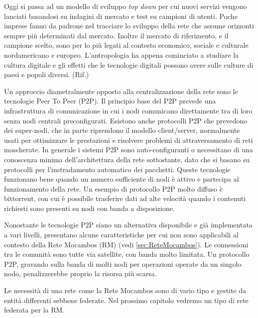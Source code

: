 Oggi si passa ad un modello di sviluppo \emph{top down} per cui nuovi
servizi vengono lanciati basandosi su indagini di mercato e test su
campioni di utenti. Poche imprese fanno da padrone nel tracciare lo
sviluppo della rete che assume orizzonti sempre più determinati dal
mercato. Inoltre il mercato di riferimento, e il campione scelto, sono
per lo più legati al contesto economico, sociale e culturale
nordamericano e europeo. L'antropologia ha appena cominciato a
studiare la cultura digitale e gli effetti che le tecnologie digitali
possono avere sulle culture di paesi e popoli diversi. (Rif.)

Un approccio diametralmente opposto alla centralizzazione della rete
sono le tecnologie Peer To Peer (P2P). Il principio base del P2P
prevede una infrastruttura di comunicazione in cui i nodi comunicano
direttamente tra di loro senza nodi centrali preconfigurati. Esistono
anche protocolli P2P che prevedono dei super-nodi, che in parte
riprendono il modello client/server, normalmente usati per ottimizzare
le prestazioni e risolvere problemi di attraversamento di reti
mascherate. In generale i sistemi P2P sono auto-configuranti o
necessitano di una conoscenza minima dell'architettura della rete
sottostante, dato che si basano su protocolli per l'instradamento
automatico dei pacchetti. Queste tecnologie funzionano bene quando un
numero sufficiente di nodi è attivo e partecipa al funzionamento della
rete. Un esempio di protocollo P2P molto diffuso è bittorrent, con cui
è possibile trasferire dati ad alte velocità quando i contenuti
richiesti sono presenti su nodi con banda a disposizione.

Nonostante le tecnologie P2P siano un alternativa disponibile e già
implementata a vari livelli, presentano alcune caratteristiche per cui
non sono applicabili al contesto della Rete Mocambos (RM)
(vedi \ref{sec:ReteMocambos}). Le connessioni tra le comunità sono tutte via
satellite, con banda molto limitata. Un protocollo P2P, gravando sulla
banda di molti nodi per operazioni operate da un singolo nodo,
penalizzerebbe proprio la risorsa più scarsa.

Le necessità di una rete come la Rete Mocambos sono di vario tipo e gestite da
entità differenti sebbene federate. Nel prossimo capitolo vedremo un
tipo di rete federata per la RM. 
